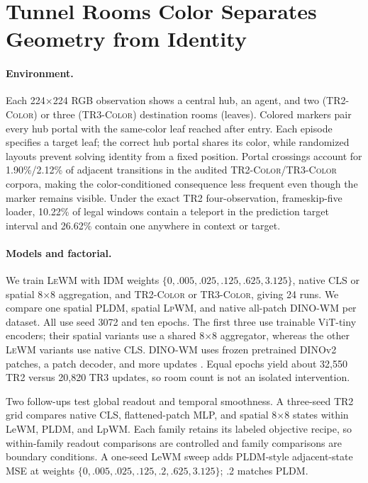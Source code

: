 \documentclass{article}
\newcommand{\trtwo}{\textsc{TR2-Color}}
\newcommand{\trthree}{\textsc{TR3-Color}}
\newcommand{\lewm}{\textsc{LeWM}}
\newcommand{\pldm}{\textsc{PLDM}}
\newcommand{\lpwm}{\textsc{LpWM}}
\newcommand{\dinowm}{\textsc{DINO-WM}}
\begin{document}
\section{Tunnel Rooms Color Separates Geometry from Identity}

\paragraph{Environment.}
Each 224$\times$224 RGB observation shows a central hub, an agent, and two
(\trtwo{}) or three (\trthree{}) destination rooms (leaves).  Colored markers
pair every hub portal with the same-color leaf reached after entry.  Each
episode specifies a target leaf; the correct hub portal shares its color,
while randomized layouts prevent solving identity from a fixed position.
Portal crossings account for 1.90\%/2.12\%
of adjacent transitions in the audited \trtwo{}/\trthree{} corpora, making the
color-conditioned consequence less frequent even though the marker remains
visible.  Under the exact TR2 four-observation, frameskip-five loader, 10.22\%
of legal windows contain a teleport in the prediction target interval and
26.62\% contain one anywhere in context or target.

\paragraph{Models and factorial.}
We train \lewm{} with IDM weights
$\{0,.005,.025,.125,.625,3.125\}$, native CLS or spatial 8$\times$8
aggregation, and \trtwo{} or \trthree{}, giving 24 runs.  We compare one
spatial \pldm{}, spatial \lpwm{}, and native all-patch \dinowm{} per dataset.
All use seed 3072 and ten epochs.  The first three use trainable ViT-tiny
encoders; their spatial variants use a shared 8$\times$8 aggregator, whereas
the other \lewm{} variants use native CLS.  \dinowm{} uses frozen pretrained
DINOv2 patches, a patch decoder, and more updates
\citep{oquab2023dinov2,zhou2025dinowm}.
Equal epochs yield about 32,550 TR2 versus 20,820 TR3 updates, so room count is
not an isolated intervention.

Two follow-ups test global readout and temporal smoothness.  A three-seed TR2
grid compares native CLS, flattened-patch MLP, and spatial 8$\times$8 states
within LeWM, PLDM, and LpWM.  Each family retains its labeled objective recipe,
so within-family readout comparisons are controlled and family comparisons are
boundary conditions.  A one-seed LeWM sweep adds PLDM-style adjacent-state MSE
at weights $\{0,.005,.025,.125,.2,.625,3.125\}$; .2 matches PLDM.
\end{document}
